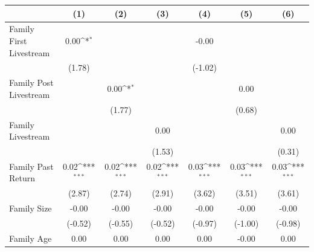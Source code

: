 {
\def\sym#1{\ifmmode^{#1}\else\(^{#1}\)\fi}
\begin{tabular}{l*{6}{c}}
\toprule
                    &\multicolumn{1}{c}{(1)}         &\multicolumn{1}{c}{(2)}         &\multicolumn{1}{c}{(3)}         &\multicolumn{1}{c}{(4)}         &\multicolumn{1}{c}{(5)}         &\multicolumn{1}{c}{(6)}         \\
\midrule
Family First Livestream&        0.00\sym{*}  &                     &                     &       -0.00         &                     &                     \\
                    &      (1.78)         &                     &                     &     (-1.02)         &                     &                     \\
\addlinespace
Family Post Livestream&                     &        0.00\sym{*}  &                     &                     &        0.00         &                     \\
                    &                     &      (1.77)         &                     &                     &      (0.68)         &                     \\
\addlinespace
Family Livestream   &                     &                     &        0.00         &                     &                     &        0.00         \\
                    &                     &                     &      (1.53)         &                     &                     &      (0.31)         \\
\addlinespace
Family Past Return  &        0.02\sym{***}&        0.02\sym{***}&        0.02\sym{***}&        0.03\sym{***}&        0.03\sym{***}&        0.03\sym{***}\\
                    &      (2.87)         &      (2.74)         &      (2.91)         &      (3.62)         &      (3.51)         &      (3.61)         \\
\addlinespace
Family Size         &       -0.00         &       -0.00         &       -0.00         &       -0.00         &       -0.00         &       -0.00         \\
                    &     (-0.52)         &     (-0.55)         &     (-0.52)         &     (-0.97)         &     (-1.00)         &     (-0.98)         \\
\addlinespace
Family Age          &        0.00         &        0.00         &        0.00         &        0.00         &       -0.00         &        0.00         \\

\end{tabular}}
